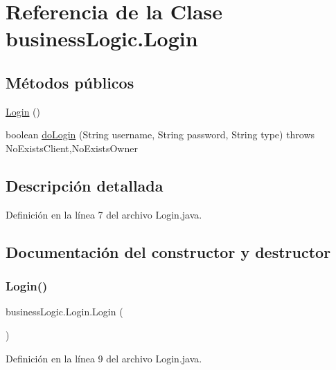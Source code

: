 \hypertarget{classbusiness_logic_1_1_login}{}\section{Referencia de la Clase business\+Logic.\+Login}
\label{classbusiness_logic_1_1_login}
\subsection*{Métodos públicos}
\begin{DoxyCompactItemize}
\item 
\mbox{\hyperlink{classbusiness_logic_1_1_login_a64297917a7eea710ed126646401da842}{Login}} ()
\item 
boolean \mbox{\hyperlink{classbusiness_logic_1_1_login_ac9f6613d5985375b441ff00347cafb18}{do\+Login}} (String username, String password, String type)  throws No\+Exists\+Client,\+No\+Exists\+Owner
\end{DoxyCompactItemize}


\subsection{Descripción detallada}


Definición en la línea 7 del archivo Login.\+java.



\subsection{Documentación del constructor y destructor}
\mbox{\label{classbusiness_logic_1_1_login_a64297917a7eea710ed126646401da842}} 
\subsubsection{\texorpdfstring{Login()}{Login()}}
{\footnotesize\ttfamily business\+Logic.\+Login.\+Login (\begin{DoxyParamCaption}{ }\end{DoxyParamCaption})}



Definición en la línea 9 del archivo Login.\+java.


\begin{DoxyCode}{0}

\end{DoxyCode}


